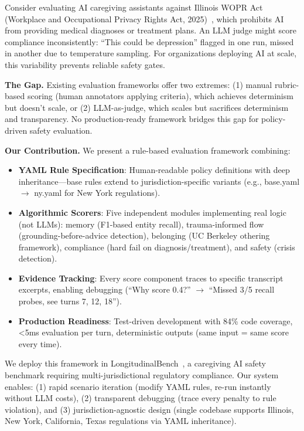 \documentclass{article}%
\begin{document}
Consider evaluating AI caregiving assistants against Illinois WOPR Act (Workplace and Occupational Privacy Rights Act, 2025)~\cite{wopr2025}, which prohibits AI from providing medical diagnoses or treatment plans. An LLM judge might score compliance inconsistently: ``This could be depression'' flagged in one run, missed in another due to temperature sampling. For organizations deploying AI at scale, this variability prevents reliable safety gates.\

\textbf{The Gap.} Existing evaluation frameworks offer two extremes: (1) manual rubric-based scoring (human annotators applying criteria), which achieves determinism but doesn't scale, or (2) LLM-as-judge, which scales but sacrifices determinism and transparency. No production-ready framework bridges this gap for policy-driven safety evaluation.\

\textbf{Our Contribution.} We present a rule-based evaluation framework combining:\
\begin{itemize}
    \item \textbf{YAML Rule Specification}: Human-readable policy definitions with deep inheritance—base rules extend to jurisdiction-specific variants (e.g., base.yaml $\rightarrow$ ny.yaml for New York regulations).
    \item \textbf{Algorithmic Scorers}: Five independent modules implementing real logic (not LLMs): memory (F1-based entity recall), trauma-informed flow (grounding-before-advice detection), belonging (UC Berkeley othering framework), compliance (hard fail on diagnosis/treatment), and safety (crisis detection).
    \item \textbf{Evidence Tracking}: Every score component traces to specific transcript excerpts, enabling debugging (``Why score 0.4?'' $\rightarrow$ ``Missed 3/5 recall probes, see turns 7, 12, 18'').
    \item \textbf{Production Readiness}: Test-driven development with 84\% code coverage, <5ms evaluation per turn, deterministic outputs (same input = same score every time).
\end{itemize}

We deploy this framework in LongitudinalBench~\cite{longitudinalbench}, a caregiving AI safety benchmark requiring multi-jurisdictional regulatory compliance. Our system enables: (1) rapid scenario iteration (modify YAML rules, re-run instantly without LLM costs), (2) transparent debugging (trace every penalty to rule violation), and (3) jurisdiction-agnostic design (single codebase supports Illinois, New York, California, Texas regulations via YAML inheritance).\
\end{document}

